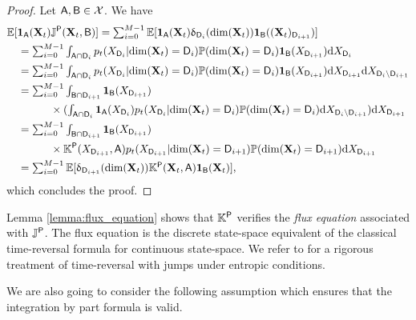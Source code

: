 \begin{proof}
  Let $\mathsf{A}, \mathsf{B} \in \mathcal{X}$. We have
  \begin{align}
    &\mathbb{E}[\mathbf{1}_{\mathsf{A}}(\mathbf{X}_t) \mathbb{J}^{\mathsf{P}}(\mathbf{X}_t, \mathsf{B})] = \textstyle \sum_{i=0}^{M-1} \mathbb{E}[\mathbf{1}_{\mathsf{A}}(\mathbf{X}_t) \updelta_{\mathsf{D}_i}(\mathrm{dim}(\mathbf{X}_t)) \mathbf{1}_{\mathsf{B}}((\mathbf{X}_t)_{\mathsf{D}_{i+1}})]\\
                                                                  &\quad = \textstyle \sum_{i=0}^{M-1} \int_{\mathsf{A} \cap \mathsf{D}_i}  p_t(X_{\mathsf{D}_i}|\mathrm{dim}(\mathbf{X}_t) = \mathsf{D}_i) \mathbb{P}(\mathrm{dim}(\mathbf{X}_t)=\mathsf{D}_i) \mathbf{1}_{\mathsf{B}}(X_{\mathsf{D}_{i+1}})  \mathrm{d} X_{\mathsf{D}_i} \\ 
    &\quad = \textstyle \sum_{i=0}^{M-1} \int_{\mathsf{A} \cap \mathsf{D}_i} p_t(X_{\mathsf{D}_i}|\mathrm{dim}(\mathbf{X}_t) = \mathsf{D}_i)\mathbb{P}(\mathrm{dim}(\mathbf{X}_t)=\mathsf{D}_i)  \mathbf{1}_{\mathsf{B}}(X_{\mathsf{D}_{i+1}}) \mathrm{d} X_{\mathsf{D}_{i+1}} \mathrm{d} X_{\mathsf{D}_i \backslash \mathsf{D}_{i+1}}    \\
    &\quad = \textstyle \sum_{i=0}^{M-1} \int_{\mathsf{B} \cap \mathsf{D}_{i+1}}  \mathbf{1}_{\mathsf{B}}(X_{\mathsf{D}_{i+1}})\\
    & \qquad \qquad \textstyle \times  (\int_{\mathsf{A} \cap \mathsf{D}_i} \mathbf{1}_{\mathsf{A}}(X_{\mathsf{D}_i}) p_t(X_{\mathsf{D}_i}|\mathrm{dim}(\mathbf{X}_t) = \mathsf{D}_i)  \mathbb{P}(\mathrm{dim}(\mathbf{X}_t)=\mathsf{D}_i) \mathrm{d} X_{\mathsf{D}_i \backslash \mathsf{D}_{i+1}} )  \mathrm{d} X_{\mathsf{D}_{i+1}} \\
    &\quad = \textstyle \sum_{i=0}^{M-1} \int_{\mathsf{B} \cap \mathsf{D}_{i+1}} \mathbf{1}_{\mathsf{B}}(X_{\mathsf{D}_{i+1}}) \\
    & \qquad \qquad \times \mathbb{K}^{\mathsf{P}}(X_{\mathsf{D}_{i+1}}, \mathsf{A}) p_t(X_{\mathsf{D}_{i+1}}|\mathrm{dim}(\mathbf{X}_t) = \mathsf{D}_{i+1}) \mathbb{P}(\mathrm{dim}(\mathbf{X}_t) = \mathsf{D}_{i+1})  \mathrm{d} X_{\mathsf{D}_{i+1}} \\
    &\quad = \textstyle \sum_{i=0}^{M-1} \mathbb{E}[\updelta_{\mathsf{D}_{i+1}}(\mathrm{dim}(\mathbf{X}_t)) \mathbb{K}^{\mathsf{P}}(\mathbf{X}_t, \mathsf{A}) \mathbf{1}_{\mathsf{B}}(\mathbf{X}_t)] ,
  \end{align}
  which concludes the proof.
\end{proof}

Lemma \ref{lemma:flux_equation} shows that $\mathbb{K}^{\mathsf{P}}$ verifies the \emph{flux
  equation} associated with $\mathbb{J}^{\mathsf{P}}$. The flux equation is the discrete
state-space equivalent of the classical time-reversal formula for continuous
state-space. We refer to \cite{conforti2022time} for a rigorous treatment of
time-reversal with jumps under entropic conditions. 

We are also going to consider the following assumption which ensures that the
integration by part formula is valid.

